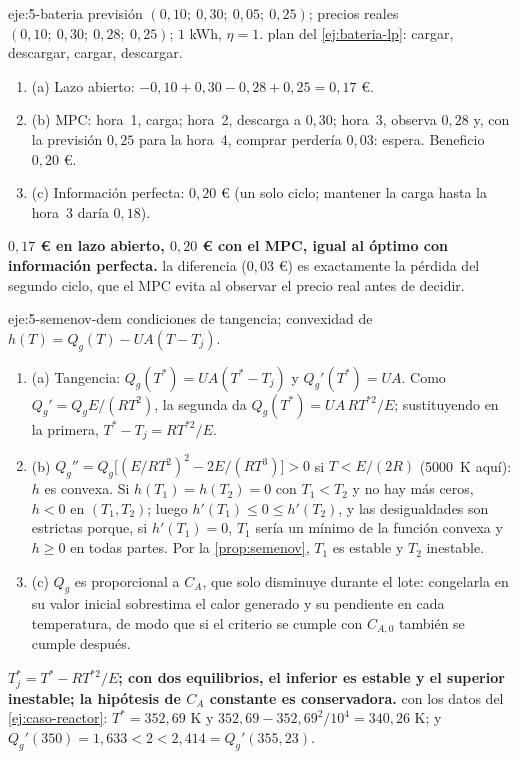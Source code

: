 \begin{solucion}{eje:5-bateria}
\datos previsión $(0{,}10;\ 0{,}30;\ 0{,}05;\ 0{,}25)$; precios reales $(0{,}10;\ 0{,}30;\ 0{,}28;\ 0{,}25)$; $1$ kWh, $\eta=1$.
\planteamiento plan del \cref{ej:bateria-lp}: cargar, descargar, cargar, descargar.
\pasos
\begin{enumerate}[label=\arabic*.]
  \item (a) Lazo abierto: $-0{,}10+0{,}30-0{,}28+0{,}25=0{,}17$ €.
  \item (b) MPC: hora~1, carga; hora~2, descarga a $0{,}30$; hora~3, observa $0{,}28$ y, con la previsión $0{,}25$ para la hora~4, comprar perdería $0{,}03$: espera. Beneficio $0{,}20$ €.
  \item (c) Información perfecta: $0{,}20$ € (un solo ciclo; mantener la carga hasta la hora~3 daría $0{,}18$).
\end{enumerate}
\resultado \textbf{$0{,}17$ € en lazo abierto, $0{,}20$ € con el MPC, igual al óptimo con información perfecta.}
\comprobacion la diferencia ($0{,}03$ €) es exactamente la pérdida del segundo ciclo, que el MPC evita al observar el precio real antes de decidir.
\end{solucion}

\begin{solucion}{eje:5-semenov-dem}
\planteamiento condiciones de tangencia; convexidad de $h(T)=Q_g(T)-UA(T-T_j)$.
\pasos
\begin{enumerate}[label=\arabic*.]
  \item (a) Tangencia: $Q_g(T^{*})=UA(T^{*}-T_j)$ y $Q_g'(T^{*})=UA$. Como $Q_g'=Q_gE/(RT^{2})$, la segunda da $Q_g(T^{*})=UA\,RT^{*2}/E$; sustituyendo en la primera, $T^{*}-T_j=RT^{*2}/E$.
  \item (b) $Q_g''=Q_g\bigl[(E/RT^{2})^{2}-2E/(RT^{3})\bigr]>0$ si $T<E/(2R)$ (5000~K aquí): $h$ es convexa. Si $h(T_1)=h(T_2)=0$ con $T_1<T_2$ y no hay más ceros, $h<0$ en $(T_1,T_2)$; luego $h'(T_1)\le0\le h'(T_2)$, y las desigualdades son estrictas porque, si $h'(T_1)=0$, $T_1$ sería un mínimo de la función convexa y $h\ge0$ en todas partes. Por la \cref{prop:semenov}, $T_1$ es estable y $T_2$ inestable.
  \item (c) $Q_g$ es proporcional a $C_A$, que solo disminuye durante el lote: congelarla en su valor inicial sobrestima el calor generado y su pendiente en cada temperatura, de modo que si el criterio se cumple con $C_{A,0}$ también se cumple después.
\end{enumerate}
\resultado \textbf{$T_j^{*}=T^{*}-RT^{*2}/E$; con dos equilibrios, el inferior es estable y el superior inestable; la hipótesis de $C_A$ constante es conservadora.}
\comprobacion con los datos del \cref{ej:caso-reactor}: $T^{*}=352{,}69$ K y $352{,}69-352{,}69^{2}/10^{4}=340{,}26$ K; y $Q_g'(350)=1{,}633<2<2{,}414=Q_g'(355{,}23)$.
\end{solucion}


